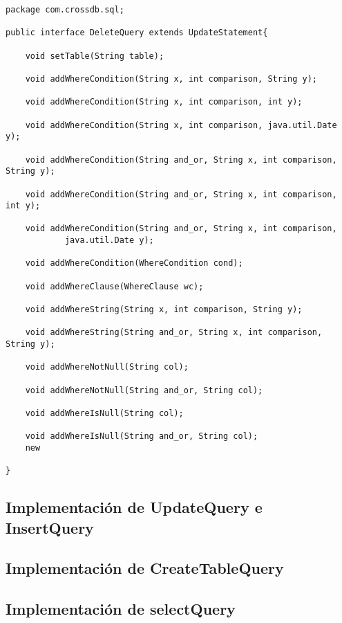 \begin{lstlisting}[title=código interfaz QueryStatement]
package com.crossdb.sql;

public interface DeleteQuery extends UpdateStatement{

	void setTable(String table);

	void addWhereCondition(String x, int comparison, String y);

	void addWhereCondition(String x, int comparison, int y);

	void addWhereCondition(String x, int comparison, java.util.Date y);

	void addWhereCondition(String and_or, String x, int comparison, String y);

	void addWhereCondition(String and_or, String x, int comparison, int y);

	void addWhereCondition(String and_or, String x, int comparison,
			java.util.Date y);

	void addWhereCondition(WhereCondition cond);

	void addWhereClause(WhereClause wc);

	void addWhereString(String x, int comparison, String y);

	void addWhereString(String and_or, String x, int comparison, String y);

	void addWhereNotNull(String col);

	void addWhereNotNull(String and_or, String col);

	void addWhereIsNull(String col);

	void addWhereIsNull(String and_or, String col);
	new

}
\end{lstlisting}



\subsection{Implementación de UpdateQuery e InsertQuery}




\subsection{Implementación de CreateTableQuery}




\subsection{Implementación de selectQuery}

